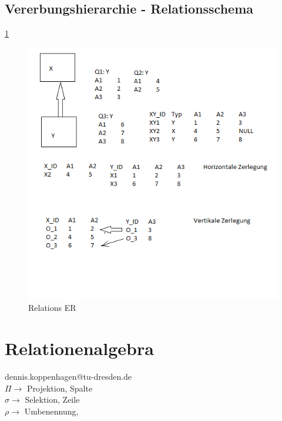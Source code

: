\subsection{Vererbungshierarchie - Relationsschema }
\ref{img:Vererbungshierarchie}
\begin{figure}
	\centering
	\includegraphics[width = 16cm]{./Database/Images/2_4.png}
	\caption{Relations ER}
	\label{img:Vererbungshierarchie}
\end{figure}

\section{Relationenalgebra}
dennis.koppenhagen@tu-dresden.de \\
\(\Pi\to\) Projektion, Spalte\\
\(\sigma\to\) Selektion, Zeile\\
\(\rho\to\) Umbenennung,\\
